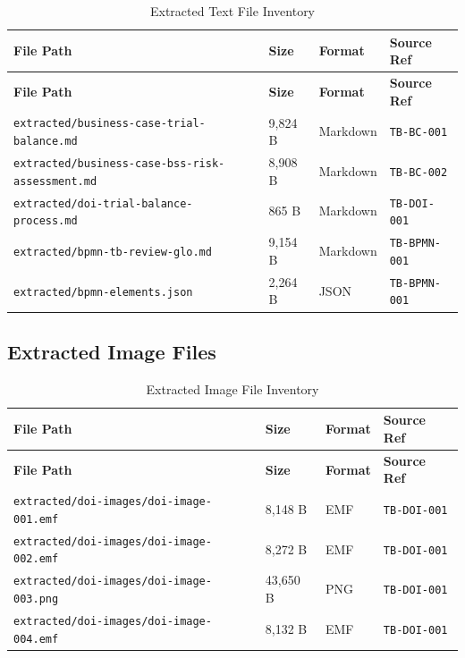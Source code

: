\documentclass[11pt,a4paper,twoside]{report}
\newcommand{\srcref}[1]{\texttt{#1}}
\begin{document}
\begin{longtable}{@{}L{6cm}C{2cm}C{2cm}L{3.5cm}@{}}
\caption{Extracted Text File Inventory}
\label{tab:extracted-text-inventory} \\
\toprule
\textbf{File Path} & \textbf{Size} & \textbf{Format} & \textbf{Source Ref} \\
\midrule
\endfirsthead
\toprule
\textbf{File Path} & \textbf{Size} & \textbf{Format} & \textbf{Source Ref} \\
\midrule
\endhead
\texttt{extracted/business-case-trial-balance.md} & 9,824 B & Markdown & \srcref{TB-BC-001} \\
\texttt{extracted/business-case-bss-risk-assessment.md} & 8,908 B & Markdown & \srcref{TB-BC-002} \\
\texttt{extracted/doi-trial-balance-process.md} & 865 B & Markdown & \srcref{TB-DOI-001} \\
\texttt{extracted/bpmn-tb-review-glo.md} & 9,154 B & Markdown & \srcref{TB-BPMN-001} \\
\texttt{extracted/bpmn-elements.json} & 2,264 B & JSON & \srcref{TB-BPMN-001} \\
\bottomrule
\end{longtable}

\subsection{Extracted Image Files}

\begin{longtable}{@{}L{6cm}C{2cm}C{2cm}L{3.5cm}@{}}
\caption{Extracted Image File Inventory}
\label{tab:extracted-image-inventory} \\
\toprule
\textbf{File Path} & \textbf{Size} & \textbf{Format} & \textbf{Source Ref} \\
\midrule
\endfirsthead
\toprule
\textbf{File Path} & \textbf{Size} & \textbf{Format} & \textbf{Source Ref} \\
\midrule
\endhead
\texttt{extracted/doi-images/doi-image-001.emf} & 8,148 B & EMF & \srcref{TB-DOI-001} \\
\texttt{extracted/doi-images/doi-image-002.emf} & 8,272 B & EMF & \srcref{TB-DOI-001} \\
\texttt{extracted/doi-images/doi-image-003.png} & 43,650 B & PNG & \srcref{TB-DOI-001} \\
\texttt{extracted/doi-images/doi-image-004.emf} & 8,132 B & EMF & \srcref{TB-DOI-001} \\
\bottomrule
\end{longtable}
\end{document}
